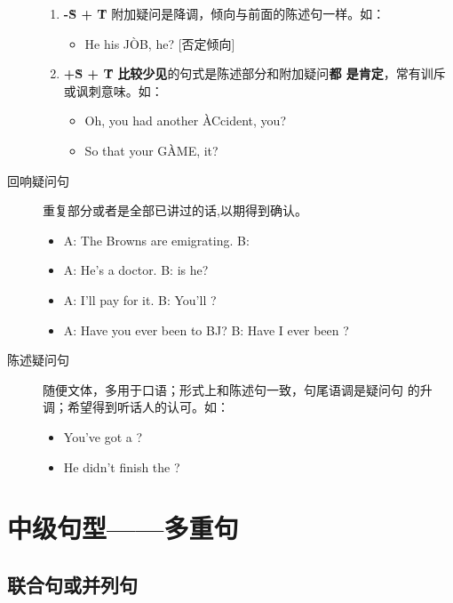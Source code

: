 \begin{description}
\begin{enumerate}
  \item \textbf{-\`S + \`T} 附加疑问是降调，倾向与前面的陈述句一样。如：
    \begin{itemize}
    \item He  his J\`OB,  he? [否定倾向]
    \end{itemize}

  \item \textbf{+\`S + \'T} \textbf{比较少见}的句式是陈述部分和附加疑问\textbf{都
      是肯定}，常有训斥或讽刺意味。如：
    \begin{itemize}
    \item Oh, you had another \`ACcident,  you?
    \item So that your G\`AME,  it?
    \end{itemize}
  \end{enumerate}


\item[回响疑问句] 重复部分或者是全部已讲过的话,以期得到确认。
\begin{itemize}
\item A: The Browns are emigrating. \qquad B: 
\item A: He's a doctor. \qquad B:  is he?
\item A: I'll pay for it. \qquad B: You'll ?
\item A: Have you ever been to BJ? \qquad B: Have I ever been ?
\end{itemize}

\item[陈述疑问句] 随便文体，多用于口语；形式上和陈述句一致，句尾语调是疑问句
  的升调；希望得到听话人的认可。如：
  \begin{itemize}
  \item You've got a ?
  \item He didn't finish the ?
  \end{itemize}
\end{description}

\part{中级句型——多重句}

\chapter{联合句或并列句}

